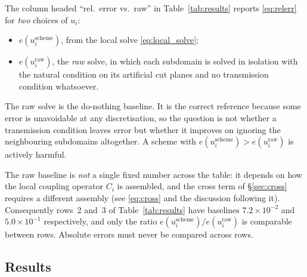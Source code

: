 The column headed ``rel.\ error vs.\ raw'' in Table~\ref{tab:results} reports
\eqref{eq:relerr} for \emph{two} choices of $u_i$:
\begin{itemize}
  \item $e(u_i^{\mathrm{scheme}})$, from the local solve
        \eqref{eq:local_solve};
  \item $e(u_i^{\mathrm{raw}})$, the \emph{raw} solve, in which each
        subdomain is solved in isolation with the natural condition on its
        artificial cut planes and no transmission condition whatsoever.
\end{itemize}
The raw solve is the do-nothing baseline. It is the correct reference because
some error is unavoidable at any discretisation, so the question is not whether
a transmission condition leaves error but whether it improves on ignoring the
neighbouring subdomains altogether. A scheme with
$e(u_i^{\mathrm{scheme}}) > e(u_i^{\mathrm{raw}})$ is actively harmful.

\begin{remark}
The raw baseline is \emph{not} a single fixed number across the table: it
depends on how the local coupling operator $C_i$ is assembled, and the cross
term of \S\ref{sec:cross} requires a different assembly (see
\eqref{eq:cross} and the discussion following it). Consequently rows~2 and~3 of
Table~\ref{tab:results} have baselines $7.2\times10^{-2}$ and
$5.0\times10^{-1}$ respectively, and only the ratio
$e(u_i^{\mathrm{scheme}})/e(u_i^{\mathrm{raw}})$ is comparable between rows.
Absolute errors must never be compared across rows.
\end{remark}

\subsection{Results}

